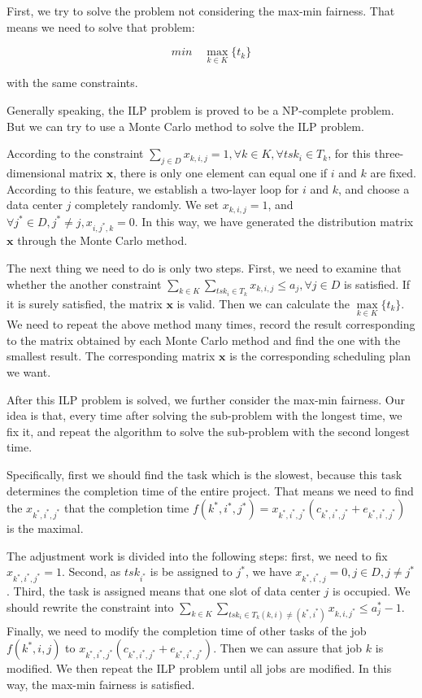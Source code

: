 \documentclass{llncs}
\begin{document}
First, we try to solve the problem not considering the max-min fairness. That means we need to solve that problem:

$$min \quad \mathop{max}\limits_{k \in K} \{ t_k \} $$ 

with the same constraints.

Generally speaking, the ILP problem is proved to be a NP-complete problem. But we can try to use a Monte Carlo method to solve the ILP problem.

According to the constraint  $\sum\limits_{j \in D} x_{k,i,j} = 1, \forall k\in K ,\forall tsk_i \in T_k $, for this three-dimensional matrix $\mathbf{x}$, there is only one element can equal one if $ i $ and $ k $ are fixed. According to this feature, we establish a two-layer loop for $i$ and $k$, and choose a data center $ j $ completely randomly. We set $ x_{k,i,j} = 1 $, and $\forall j^* \in D, j^* \neq j, x_{i,j^*,k} = 0 $. In this way, we have generated the distribution matrix $ \mathbf{x} $ through the Monte Carlo method.

The next thing we need to do is only two steps. First, we need to examine that whether the another constraint $ \sum\limits_{ k\in K } \sum\limits_{tsk_i \in T_k } x_{k,i,j} \leqslant a_j, \forall j \in D  $ is satisfied. If it is surely satisfied, the matrix $\mathbf{x}$ is valid. Then we can calculate the $ \mathop{max}\limits_{k \in K} \{ t_k \}  $. We need to repeat the above method many times, record the result corresponding to the matrix obtained by each Monte Carlo method and find the one with the smallest result. The corresponding matrix $ \mathbf{x} $ is the corresponding scheduling plan we want.

After this ILP problem is solved, we further consider the max-min fairness. Our idea is that, every time after solving the sub-problem with the longest time, we fix it, and repeat the algorithm to solve the sub-problem with the second longest time.

Specifically, first we should find the task which is the slowest, because this task determines the completion time of the entire project. That means we need to find the $  x_{k^*,i^*,j^*} $ that the completion time $ f(k^*,i^*,j^*) =  x_{k^*,i^*,j^*}(c_{k^*,i^*,j^*}+e_{k^*,i^*,j^*}) $ is the maximal. 

The adjustment work is divided into the following steps: first, we need to fix $  x_{k^*,i^*,j^*} = 1 $. Second, as $ tsk_{i^*} $ is be assigned to $ j^* $, we have $  x_{k^*,i^*,j} = 0, j \in D, j \neq j^* $. Third, the task is assigned means that one slot of data center $ j $ is occupied. We should rewrite the constraint into $ \sum\limits_{ k\in K } \sum\limits_{tsk_i \in T_k (k,i) \neq (k^*,i^*) } x_{k,i,j^*} \leqslant a_j^*  - 1$. Finally, we need to modify the completion time of other tasks of the job $ f(k^*,i,j) $ to $  x_{k^*,i^*,j^*}(c_{k^*,i^*,j^*}+e_{k^*,i^*,j^*}) $. Then we can assure that job $ k $ is modified. We then repeat the ILP problem until all jobs are modified. In this way, the max-min fairness is satisfied.
\end{document}
